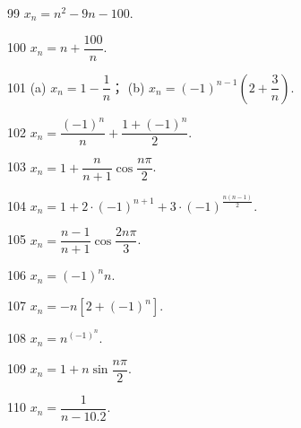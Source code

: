 
\begin{prob}[S]{99}
$x_n = n^2 - 9n - 100$.
\end{prob}

\begin{prob}[S]{100}
$x_n = n + \dfrac{100}{n}$.
\end{prob}


\begin{prob}[M]{101}
(a) $x_n = 1 - \dfrac{1}{n}$； \qquad (b) $x_n = (-1)^{n-1}\left(2 + \dfrac{3}{n}\right)$.
\end{prob}

\begin{prob}[S]{102}
$x_n = \dfrac{(-1)^n}{n} + \dfrac{1+(-1)^n}{2}$.
\end{prob}

\begin{prob}[S]{103}
$x_n = 1 + \dfrac{n}{n+1}\cos\dfrac{n\pi}{2}$.
\end{prob}

\begin{prob}[S]{104}
$x_n = 1 + 2\cdot(-1)^{n+1} + 3\cdot(-1)^{\frac{n(n-1)}{2}}$.
\end{prob}

\begin{prob}[S]{105}
$x_n = \dfrac{n-1}{n+1}\cos\dfrac{2n\pi}{3}$.
\end{prob}

\begin{prob}[S]{106}
$x_n = (-1)^n n$.
\end{prob}

\begin{prob}[S]{107}
$x_n = -n[2 + (-1)^n]$.
\end{prob}

\begin{prob}[S]{108}
$x_n = n^{(-1)^n}$.
\end{prob}

\begin{prob}[S]{109}
$x_n = 1 + n\sin\dfrac{n\pi}{2}$.
\end{prob}

\begin{prob}[S]{110}
$x_n = \dfrac{1}{n - 10.2}$.
\end{prob}


